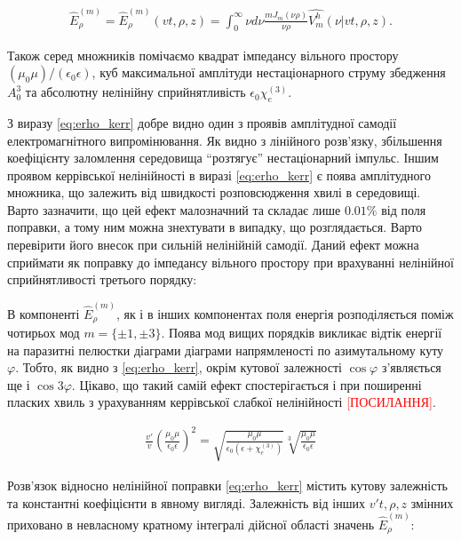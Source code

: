 \begin{equation} \begin{aligned} \label{eq:erho_norm}
\hat{E}_\rho^{(m)} = \hat{E}_\rho^{(m)} (vt,\rho,z) = 
\int_0^\infty \nu d \nu \frac{m J_m(\nu \rho)}{\nu \rho} 
\hat{V_m^h} (\nu | vt,\rho,z).
\end{aligned} \end{equation}

Також серед множників помічаємо квадрат імпедансу вільного простору 
$ (\mu_0 \mu) / (\epsilon_0 \epsilon) $, куб максимальної амплітуди 
нестаціонарного струму збедження $ A_0^3 $ та абсолютну нелінійну 
сприйнятливість $ \epsilon_0 \chi_e^{(3)} $.

З виразу \eqref{eq:erho_kerr} добре видно один з проявів амплітудної
самодії електромагнітного випромінювання. Як видно з лінійного розв'язку,
збільшення коефіцієнту заломлення середовища ``розтягує'' нестаціонарний 
імпульс. Іншим проявом керрівської нелінійності в виразі \eqref{eq:erho_kerr} 
є поява амплітудного множника, що залежить від швидкості розповсюдження 
хвилі в середовищі. Варто зазначити, що цей ефект малозначний та складає 
лише $ 0.01\% $ від поля поправки, а тому ним можна знехтувати в випадку, 
що розглядається. Варто перевірити його внесок при сильній нелінійній 
самодії. Даний ефект можна сприймати як поправку до імпедансу вільного 
простору при врахуванні нелінійної сприйнятливості третього порядку:

В компоненті $ \hat{E}_\rho^{(m)} $, як і в інших компонентах поля енергія 
розподіляється поміж чотирьох мод $ m = \{ \pm 1, \pm 3 \} $. Поява мод вищих 
порядків викликає відтік енергії на паразитні пелюстки діаграми діаграми 
напрямленості по азимутальному куту $ \varphi $. Тобто, як видно з 
\eqref{eq:erho_kerr}, окрім кутової залежності $ \cos \varphi $ з'являється
ще і $ \cos 3 \varphi $. Цікаво, що такий самій ефект спостерігається і при 
поширенні пласких хвиль з урахуванням керрівської слабкої нелінійності 
\textcolor{red}{[ПОСИЛАННЯ]}.

\begin{equation*} \begin{aligned}
\frac{v'}{v}
\left( \frac{\mu_0 \mu}{\epsilon_0 \epsilon} \right)^2 = 
\sqrt{\frac{\mu_0 \mu}{\epsilon_0 \left( \epsilon + \chi_e^{(3)} \right)}}
\sqrt[3]{\frac{\mu_0 \mu}{\epsilon_0 \epsilon}} 
\end{aligned} \end{equation*}

Розв'язок відносно нелінійної поправки \eqref{eq:erho_kerr} містить кутову 
залежність та константні коефіцієнти в явному вигляді. Залежність від інших 
$ v't, \rho, z $ змінних приховано в невласному кратному інтегралі дійсної 
області значень $ \hat{E}_\rho^{(m)} $:


